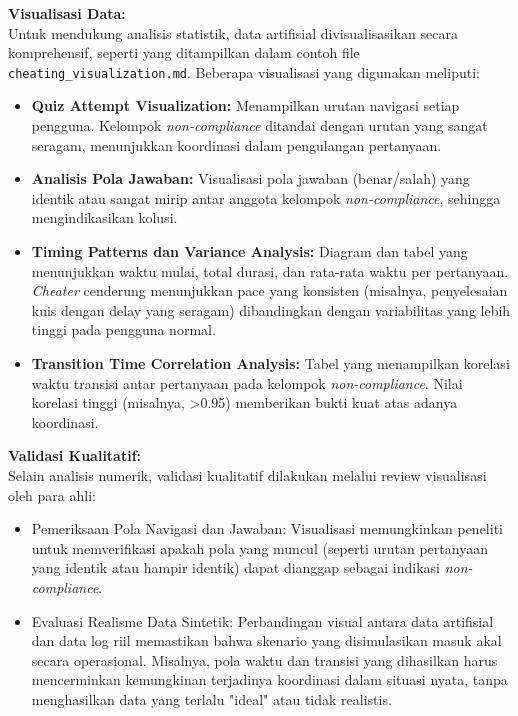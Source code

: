 \textbf{Visualisasi Data:} \\
Untuk mendukung analisis statistik, data artifisial divisualisasikan secara komprehensif, seperti yang ditampilkan dalam contoh file \texttt{cheating\_visualization.md}. Beberapa visualisasi yang digunakan meliputi:
\begin{itemize}
    \item \textbf{Quiz Attempt Visualization:} Menampilkan urutan navigasi setiap pengguna. Kelompok \textit{non-compliance} ditandai dengan urutan yang sangat seragam, menunjukkan koordinasi dalam pengulangan pertanyaan.
    \item \textbf{Analisis Pola Jawaban:} Visualisasi pola jawaban (benar/salah) yang identik atau sangat mirip antar anggota kelompok \textit{non-compliance}, sehingga mengindikasikan kolusi.
    \item \textbf{Timing Patterns dan Variance Analysis:} Diagram dan tabel yang menunjukkan waktu mulai, total durasi, dan rata-rata waktu per pertanyaan. \textit{Cheater} cenderung menunjukkan pace yang konsisten (misalnya, penyelesaian kuis dengan delay yang seragam) dibandingkan dengan variabilitas yang lebih tinggi pada pengguna normal.
    \item \textbf{Transition Time Correlation Analysis:} Tabel yang menampilkan korelasi waktu transisi antar pertanyaan pada kelompok \textit{non-compliance}. Nilai korelasi tinggi (misalnya, >0.95) memberikan bukti kuat atas adanya koordinasi.
\end{itemize}

\textbf{Validasi Kualitatif:} \\
Selain analisis numerik, validasi kualitatif dilakukan melalui review visualisasi oleh para ahli:
\begin{itemize}
    \item Pemeriksaan Pola Navigasi dan Jawaban: Visualisasi memungkinkan peneliti untuk memverifikasi apakah pola yang muncul (seperti urutan pertanyaan yang identik atau hampir identik) dapat dianggap sebagai indikasi \textit{non-compliance}.
    \item Evaluasi Realisme Data Sintetik: Perbandingan visual antara data artifisial dan data log riil memastikan bahwa skenario yang disimulasikan masuk akal secara operasional. Misalnya, pola waktu dan transisi yang dihasilkan harus mencerminkan kemungkinan terjadinya koordinasi dalam situasi nyata, tanpa menghasilkan data yang terlalu "ideal" atau tidak realistis.
\end{itemize}

